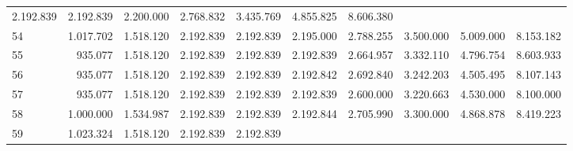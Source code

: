 \begin{tabular}{llllllllll}
  \multicolumn{1}{r}{2.192.839} &
  \multicolumn{1}{r}{2.192.839} &
  \multicolumn{1}{r}{2.200.000} &
  \multicolumn{1}{r}{2.768.832} &
  \multicolumn{1}{r}{3.435.769} &
  \multicolumn{1}{r}{4.855.825} &
  \multicolumn{1}{r}{8.606.380} \\
\multicolumn{1}{l}{\hspace{1em}54} &
  \multicolumn{1}{|r}{1.017.702} &
  \multicolumn{1}{r}{1.518.120} &
  \multicolumn{1}{r}{2.192.839} &
  \multicolumn{1}{r}{2.192.839} &
  \multicolumn{1}{r}{2.195.000} &
  \multicolumn{1}{r}{2.788.255} &
  \multicolumn{1}{r}{3.500.000} &
  \multicolumn{1}{r}{5.009.000} &
  \multicolumn{1}{r}{8.153.182} \\
\multicolumn{1}{l}{\hspace{1em}55} &
  \multicolumn{1}{|r}{935.077} &
  \multicolumn{1}{r}{1.518.120} &
  \multicolumn{1}{r}{2.192.839} &
  \multicolumn{1}{r}{2.192.839} &
  \multicolumn{1}{r}{2.192.839} &
  \multicolumn{1}{r}{2.664.957} &
  \multicolumn{1}{r}{3.332.110} &
  \multicolumn{1}{r}{4.796.754} &
  \multicolumn{1}{r}{8.603.933} \\
\multicolumn{1}{l}{\hspace{1em}56} &
  \multicolumn{1}{|r}{935.077} &
  \multicolumn{1}{r}{1.518.120} &
  \multicolumn{1}{r}{2.192.839} &
  \multicolumn{1}{r}{2.192.839} &
  \multicolumn{1}{r}{2.192.842} &
  \multicolumn{1}{r}{2.692.840} &
  \multicolumn{1}{r}{3.242.203} &
  \multicolumn{1}{r}{4.505.495} &
  \multicolumn{1}{r}{8.107.143} \\
\multicolumn{1}{l}{\hspace{1em}57} &
  \multicolumn{1}{|r}{935.077} &
  \multicolumn{1}{r}{1.518.120} &
  \multicolumn{1}{r}{2.192.839} &
  \multicolumn{1}{r}{2.192.839} &
  \multicolumn{1}{r}{2.192.839} &
  \multicolumn{1}{r}{2.600.000} &
  \multicolumn{1}{r}{3.220.663} &
  \multicolumn{1}{r}{4.530.000} &
  \multicolumn{1}{r}{8.100.000} \\
\multicolumn{1}{l}{\hspace{1em}58} &
  \multicolumn{1}{|r}{1.000.000} &
  \multicolumn{1}{r}{1.534.987} &
  \multicolumn{1}{r}{2.192.839} &
  \multicolumn{1}{r}{2.192.839} &
  \multicolumn{1}{r}{2.192.844} &
  \multicolumn{1}{r}{2.705.990} &
  \multicolumn{1}{r}{3.300.000} &
  \multicolumn{1}{r}{4.868.878} &
  \multicolumn{1}{r}{8.419.223} \\
\multicolumn{1}{l}{\hspace{1em}59} &
  \multicolumn{1}{|r}{1.023.324} &
  \multicolumn{1}{r}{1.518.120} &
  \multicolumn{1}{r}{2.192.839} &
  \multicolumn{1}{r}{2.192.839} &

\end{tabular}
